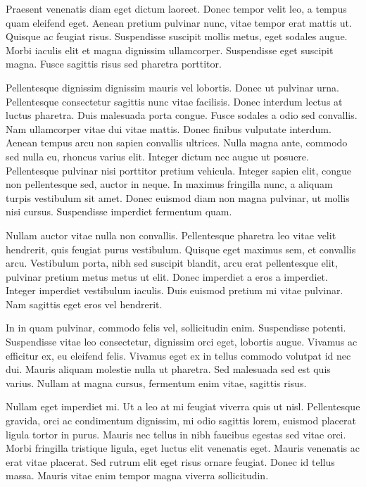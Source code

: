 Praesent venenatis diam eget dictum laoreet. Donec tempor velit leo, a tempus
quam eleifend eget. Aenean pretium pulvinar nunc, vitae tempor erat mattis ut.
Quisque ac feugiat risus. Suspendisse suscipit mollis metus, eget sodales
augue. Morbi iaculis elit et magna dignissim ullamcorper. Suspendisse eget
suscipit magna. Fusce sagittis risus sed pharetra porttitor.

Pellentesque dignissim dignissim mauris vel lobortis. Donec ut pulvinar urna.
Pellentesque consectetur sagittis nunc vitae facilisis. Donec interdum lectus
at luctus pharetra. Duis malesuada porta congue. Fusce sodales a odio sed
convallis. Nam ullamcorper vitae dui vitae mattis. Donec finibus vulputate
interdum. Aenean tempus arcu non sapien convallis ultrices. Nulla magna ante,
commodo sed nulla eu, rhoncus varius elit. Integer dictum nec augue ut posuere.
Pellentesque pulvinar nisi porttitor pretium vehicula. Integer sapien elit,
congue non pellentesque sed, auctor in neque. In maximus fringilla nunc, a
aliquam turpis vestibulum sit amet. Donec euismod diam non magna pulvinar, ut
mollis nisi cursus. Suspendisse imperdiet fermentum quam.

Nullam auctor vitae nulla non convallis. Pellentesque pharetra leo vitae velit
hendrerit, quis feugiat purus vestibulum. Quisque eget maximus sem, et
convallis arcu. Vestibulum porta, nibh sed suscipit blandit, arcu erat
pellentesque elit, pulvinar pretium metus metus ut elit. Donec imperdiet a eros
a imperdiet. Integer imperdiet vestibulum iaculis. Duis euismod pretium mi
vitae pulvinar. Nam sagittis eget eros vel hendrerit.

In in quam pulvinar, commodo felis vel, sollicitudin enim. Suspendisse potenti.
Suspendisse vitae leo consectetur, dignissim orci eget, lobortis augue. Vivamus
ac efficitur ex, eu eleifend felis. Vivamus eget ex in tellus commodo volutpat
id nec dui. Mauris aliquam molestie nulla ut pharetra. Sed malesuada sed est
quis varius. Nullam at magna cursus, fermentum enim vitae, sagittis risus.

Nullam eget imperdiet mi. Ut a leo at mi feugiat viverra quis ut nisl.
Pellentesque gravida, orci ac condimentum dignissim, mi odio sagittis lorem,
euismod placerat ligula tortor in purus. Mauris nec tellus in nibh faucibus
egestas sed vitae orci. Morbi fringilla tristique ligula, eget luctus elit
venenatis eget. Mauris venenatis ac erat vitae placerat. Sed rutrum elit eget
risus ornare feugiat. Donec id tellus massa. Mauris vitae enim tempor magna
viverra sollicitudin.

